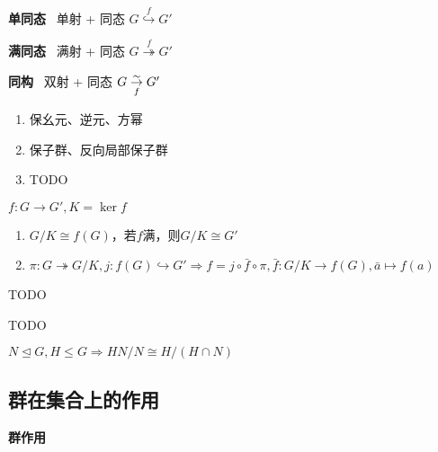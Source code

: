 \documentclass[a4paper,10pt]{ctexart}
\newcommand*{\impl}{\Rightarrow}
\renewcommand*{\leq}{\leqslant}
\newcommand*{\nmsubgroupeq}{\trianglelefteq}
\begin{document}
\begin{multicols}{3}
    \textbf{单同态} \ 单射 + 同态 $G \overset{f}{\hookrightarrow} G'$

    \textbf{满同态} \ 满射 + 同态 $G \overset{f}{\twoheadrightarrow} G'$

    \textbf{同构} \ 双射 + 同态 $G \overunderset{\sim}{f}{\rightarrow} G'$

    \begin{theorem}[同态性质]
        \hfil

        \begin{enumerate}
            \item 保幺元、逆元、方幂
            \item 保子群、反向局部保子群

            \item TODO
        \end{enumerate}
    \end{theorem}

    \begin{theorem}[同态基本定理]
        $f: G \rightarrow G', K = \ker f$

        \begin{enumerate}
            \item $G/K \cong f(G)$，若$f$满，则$G/K \cong G'$
            \item $\pi: G \twoheadrightarrow G/K, j: f(G) \hookrightarrow G' \impl f = j \circ \bar{f} \circ \pi, \bar{f}: G/K \rightarrow f(G), \bar{a} \mapsto f(a)$
        \end{enumerate}
    \end{theorem}

    \begin{theorem}[子群对应定理]
        TODO
    \end{theorem}

    \begin{theorem}
        TODO
    \end{theorem}

    \begin{theorem}
        \hfil

        $N \nmsubgroupeq G, H \leq G \impl HN/N \cong H/(H \cap N)$
    \end{theorem}

    \subsection{群在集合上的作用}

    \textbf{群作用}


\end{multicols}
\end{document}
